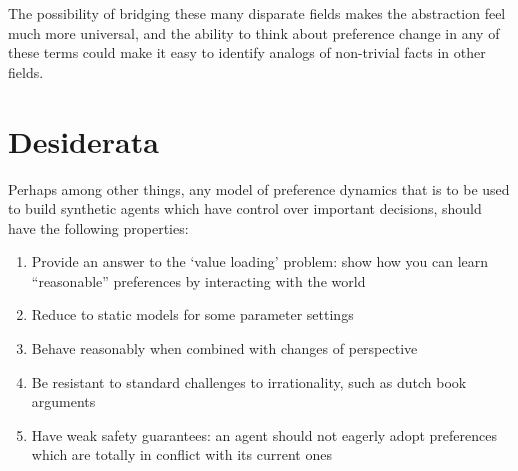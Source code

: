 \documentclass{article}
\begin{document}
	The possibility of bridging these many disparate fields makes the abstraction feel much more universal, and the ability to think about preference change in any of these terms could make it easy to identify analogs of non-trivial facts in other fields.
	

%	
%	
%	
	
	

	\section{Desiderata}


	
	Perhaps among other things, any model of preference dynamics that is to be used to build synthetic agents which have control over important decisions, should have the following properties: 
	\begin{enumerate}[noitemsep, label=\textbf{D\arabic*}.]
		\item Provide an answer to the `value loading' problem: show how you can learn ``reasonable'' preferences by interacting with the world
		\item Reduce to static models for some parameter settings
		\item Behave reasonably when combined with changes of perspective 
		\item Be resistant to standard challenges to irrationality, such as dutch book arguments
		\item Have weak safety guarantees: an agent should not eagerly adopt preferences which are totally in conflict with its current ones
	\end{enumerate}
	
\end{document}
